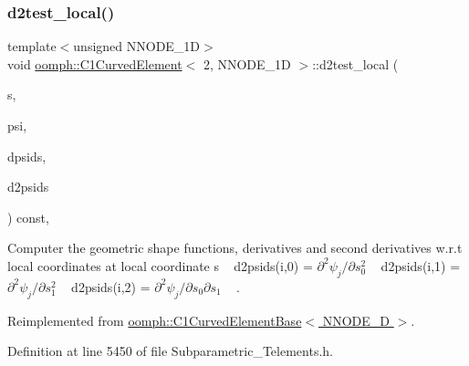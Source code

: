 \subsubsection{\texorpdfstring{d2test\+\_\+local()}{d2test\_local()}}
{\footnotesize\ttfamily template$<$unsigned N\+N\+O\+D\+E\+\_\+1D$>$ \\
void \hyperlink{classoomph_1_1C1CurvedElement}{oomph\+::\+C1\+Curved\+Element}$<$ 2, N\+N\+O\+D\+E\+\_\+1D $>$\+::d2test\+\_\+local (\begin{DoxyParamCaption}\item[{const \hyperlink{classoomph_1_1Vector}{Vector}$<$ double $>$ \&}]{s,  }\item[{\hyperlink{classoomph_1_1Shape}{Shape} \&}]{psi,  }\item[{\hyperlink{classoomph_1_1DShape}{D\+Shape} \&}]{dpsids,  }\item[{\hyperlink{classoomph_1_1DShape}{D\+Shape} \&}]{d2psids }\end{DoxyParamCaption}) const\hspace{0.3cm}{\ttfamily [inline]}, {\ttfamily [virtual]}}



Computer the geometric shape functions, derivatives and second derivatives w.\+r.\+t local coordinates at local coordinate s ~\newline
d2psids(i,0) = $ \partial^2 \psi_j / \partial s_0^2 $ ~\newline
d2psids(i,1) = $ \partial^2 \psi_j / \partial s_1^2 $ ~\newline
d2psids(i,2) = $ \partial^2 \psi_j / \partial s_0 \partial s_1 $ ~\newline
. 



Reimplemented from \hyperlink{classoomph_1_1C1CurvedElementBase_aedb2b90914f244cd86b2565a658cb9eb}{oomph\+::\+C1\+Curved\+Element\+Base$<$ N\+N\+O\+D\+E\+\_\+D $>$}.



Definition at line 5450 of file Subparametric\+\_\+\+Telements.\+h.

\mbox{\label{classoomph_1_1C1CurvedElement_3_012_00_01NNODE__1D_01_4_a51fd0d8ec09057548696aa99562b9f5a}} 
